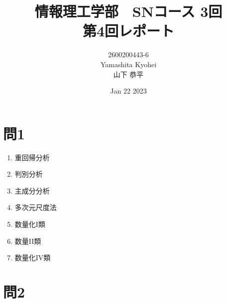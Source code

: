 \documentclass[dvipdfmx,autodetect-engine,titlepage]{jsarticle}
\title{情報理工学部　SNコース 3回\\
第4回レポート}
\author{2600200443-6\\Yamashita Kyohei\\山下 恭平}
\date{Jan 22 2023}
\begin{document}
\maketitle

\section*{問1}

\begin{enumerate}
  \item 重回帰分析
  \item 判別分析
  \item 主成分分析
  \item 多次元尺度法
  \item 数量化I類
  \item 数量II類
  \item 数量化IV類
\end{enumerate}

\section*{問2}
\end{document}
